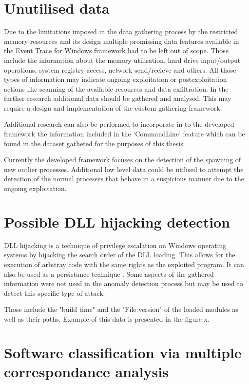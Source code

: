 \documentclass[a4paper,twoside,12pt]{book}
\begin{document}
\section{Unutilised data}

Due to the limitations imposed in the data gathering process by the restricted memory resources and its
design multiple promissing data features available in the Event Trace for Windows framework had to be
left out of scope. Those include the information about the memory utilisation, hard drive input/output 
operations, system registry access, network send/recieve and others. All those types of information
may indicate ongoing exploitation or postexploitation actions like scanning of the available resources
and data exfiltration. In the further research additional 
data should be gathered and analysed. This may require a design and implementation of the custom  
gathering framework.

Additional research can also be performed to incorporate in to the developed framework the 
information included in the 'CommandLine' feature which can be found in the dataset gathered for the purposes
of this thesis.

Currently the developed framework focuses on the detection of the spawning of new outlier processes.
Additional low level data could be utilised to attempt the detection of the normal processes that behave
in a suspicious manner due to the ongoing exploitation.

\section{Possible DLL hijacking detection}

DLL hijacking is a technique of privilege escalation on Windows operating systems by hijacking the 
search order of the DLL loading. This allows for the execution of arbitray code with the same rights 
as the exploited program. It can also be used as a persistance technique \cite{bib:DLLhijacking}.
Some aspects of the gathered information were not used in the anomaly detection process but may be
used to detect this specific type of attack. 

Those include the "build time" and the "File version" of the loaded modules as well as their paths.
Example of this data is presented in the figure x.

\section{Software classification via multiple correspondance analysis}
\end{document}
